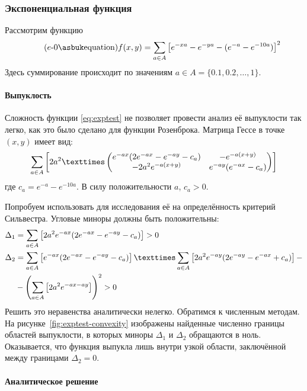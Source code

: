 \subsubsection{Экспоненциальная функция}
\label{sec:exptest}

Рассмотрим функцию
\begin{equation}
  \label{eq:exptest}
  \tag{$e$-\theequation}
  f(x, y) = \suml_{a\in A}\left [
    e^{-xa}-e^{-ya}-(e^{-a}-e^{-10a})\right ]^2
\end{equation}
Здесь суммирование происходит по значениям $a \in A =\{0.1, 0.2, \dotsc, 1\}$.

\paragraph{Выпуклость}

Сложность функции \eqref{eq:exptest} не позволяет провести анализ её
выпуклости так легко, как это было сделано для функции Розенброка.
Матрица Гессе в точке $(x, y)$ имеет вид:
\begin{equation}
  \label{eq:exptest-hess}
  \suml_{a\in A}\left[2a^2×
  \begin{pmatrix}
    e^{-ax}(2e^{-ax}-e^{-ay}-c_a) & -e^{-a(x+y)} \\
    -2a^2e^{-a(x+y)} & e^{-ay}(e^{-ax}-c_a)
  \end{pmatrix}\right]
\end{equation}
где $c_a = e^{-a}-e^{-10a}$. В силу положительности $a$, $c_a>0$.

Попробуем использовать для исследования её на определённость критерий
Сильвестра. Угловые миноры должны быть положительны:
\begin{align*}
  \Delta_1 &= \suml_{a\in A}
  \left[ 2a^2e^{-ax}(2e^{-ax}-e^{-ay}-c_a) \right] > 0\\
  \Delta_2 &= \suml_{a\in A}
  \left[ e^{-ax}(2e^{-ax}-e^{-ay}-c_a) \right]×
  \suml_{a\in A}
  \left[ 2a^2e^{-ay}(2e^{-ay}-e^{-ax}+c_a) \right]-\\
  &-\left(\suml_{a\in A}
  \left[ 2a^2e^{-ax-ay} \right] \right)^2
  > 0
\end{align*}
Решить это неравенства аналитически нелегко. Обратимся к численным
методам. На рисунке \ref{fig:exptest-convexity} изображены найденные
численно границы областей выпуклости, в которых миноры $\Delta_1$ и
$\Delta_2$ обращаются в ноль. Оказывается, что функция выпукла лишь
внутри узкой области, заключённой между границами $\Delta_2=0$.

\paragraph{Аналитическое решение}


